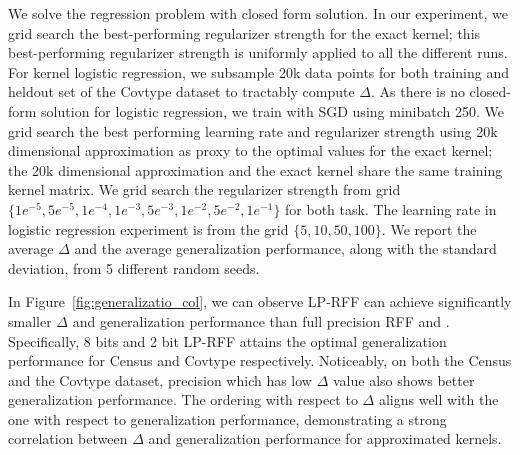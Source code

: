 We solve the regression problem with closed form solution. In our experiment, we grid search the best-performing regularizer strength for the exact kernel; this best-performing regularizer strength is uniformly applied to all the different runs. For kernel logistic regression, we subsample 20k data points for both training and heldout set of the Covtype dataset to tractably compute $\Delta$. As there is no closed-form solution for logistic regression, we train with SGD using minibatch 250. We grid search the best performing learning rate and regularizer strength using 20k dimensional \Nystrom approximation as proxy to the optimal values for the exact kernel; the 20k dimensional \Nystrom approximation and the exact kernel share the same training kernel matrix. We grid search the regularizer strength from grid $\{1e^{-5}, 5e^{-5}, 1e^{-4}, 1e^{-3}, 5e^{-3}, 1e^{-2}, 5e^{-2}, 1e^{-1}\}$ for both task. The learning rate in logistic regression experiment is from the grid $\{5, 10, 50, 100\}$. We report the average $\Delta$ and the average generalization performance, along with the standard deviation, from 5 different random seeds.

In Figure~\ref{fig:generalizatio_col}, we can observe LP-RFF can achieve significantly smaller $\Delta$ and generalization performance than full precision RFF and \Nystrom. Specifically, 8 bits and 2 bit LP-RFF attains the optimal generalization performance for Census and Covtype respectively. Noticeably, on both the Census and the Covtype dataset, precision which has low $\Delta$ value also shows better generalization performance. The ordering with respect to $\Delta$ aligns well with the one with respect to generalization performance, demonstrating a strong correlation between $\Delta$ and generalization performance for approximated kernels.

